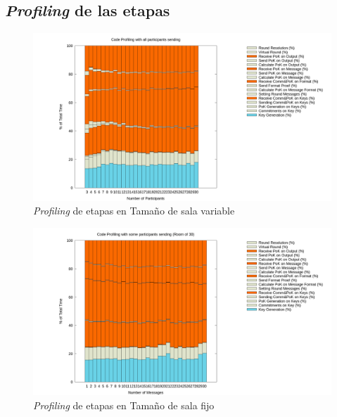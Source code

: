 \subsection{\emph{Profiling} de las etapas}

\begin{figure}[H]
  \centering
    \includegraphics[scale=0.25]{logs/logs_all/profile.png}
  \caption{\emph{Profiling} de etapas en Tamaño de sala variable}
  \label{fig:profile-variable}
\end{figure}

\begin{figure}[H]
  \centering
    \includegraphics[scale=0.25]{logs/logs_partial_30/profile.png}
  \caption{\emph{Profiling} de etapas en Tamaño de sala fijo}
  \label{fig:profile-fixed}
\end{figure}

